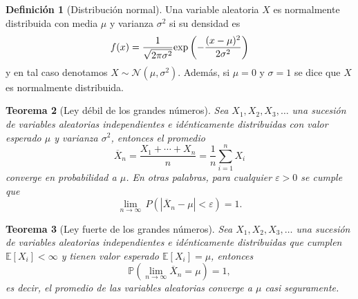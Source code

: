 \documentclass[11pt,a4paper]{book}
\newtheorem{teorema}{Teorema}[section]
\theoremstyle{definition}%
\newtheorem{definicion}[teorema]{Definici\'on}
\newcommand{\EV}[1]{\mathbb{E}\left[#1\right]}
\newcommand{\Prob}[1]{\mathds{P}\left( #1 \right)}
\renewcommand{\exp}[1]{\textup{exp}\left(#1\right)}
\begin{document}
            \begin{definicion}[Distribución normal]
                Una variable aleatoria \(X\) es normalmente distribuida con media \(\mu\) y varianza \(\sigma^{2}\) si su densidad es 
                \begin{equation}
                    f(x) = \frac{1}{\sqrt{2\pi\sigma^{2}}}\exp{-\frac{(x-\mu)^{2}}{2\sigma^{2}}}
                \end{equation}
                y en tal caso denotamos \(X \sim \mathcal{N}(\mu,\sigma^{2})\). Además, si $\mu=0$ y $\sigma=1$ se dice que \(X\) es normalmente distribuida.
            \end{definicion}
            \begin{teorema}[Ley débil de los grandes números]\label{large numbers weak}
                Sea  $X_{1}, X_{2}, X_{3}, \dots$ una sucesión de variables aleatorias independientes e idénticamente distribuidas con valor esperado 
                \(\mu\) y varianza \(\sigma^{2}\), entonces el promedio
                \[
                \overline{X}_{n} = \frac{X_{1} + \cdots + X_{n}}{n}
                = \frac{1}{n} \sum_{i=1}^{n} X_{i}
                \]
                converge en probabilidad a \(\mu\). En otras palabras, para cualquier 
                \(\varepsilon>0\) se cumple que
                \[
                \lim_{n \to \infty} \, P\!\left( \left|\overline{X}_{n} - \mu \right| < \varepsilon \right) = 1.
                \]
            \end{teorema}
            \begin{teorema}[Ley fuerte de los grandes números]\label{large numbers strong}
                Sea  $X_{1}, X_{2}, X_{3}, \dots$ una sucesión de variables aleatorias independientes e idénticamente distribuidas que cumplen 
                \(\EV{X_{i}}< \infty\) y tienen valor esperado 
                \(\EV{X_{i}}= \mu\), entonces
                \begin{equation*}
                    \Prob{ \lim_{n \to \infty} \overline{X}_{n} = \mu}= 1,
                \end{equation*}
                es decir, el promedio de las variables aleatorias converge a \(\mu\) casi seguramente. 
            \end{teorema}
\end{document}
